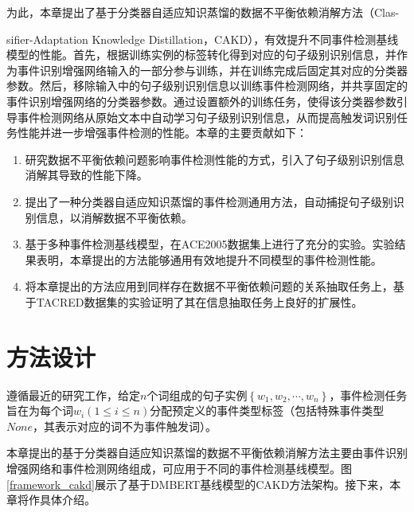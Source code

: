 为此，本章提出了基于分类器自适应知识蒸馏的数据不平衡依赖消解方法（Clas-

\noindent sifier-Adaptation Knowledge Distillation，CAKD），有效提升不同事件检测基线模型的性能。首先，根据训练实例的标签转化得到对应的句子级别识别信息，并作为事件识别增强网络输入的一部分参与训练，并在训练完成后固定其对应的分类器参数。然后，移除输入中的句子级别识别信息以训练事件检测网络，并共享固定的事件识别增强网络的分类器参数。通过设置额外的训练任务，使得该分类器参数引导事件检测网络从原始文本中自动学习句子级别识别信息，从而提高触发词识别任务性能并进一步增强事件检测的性能。本章的主要贡献如下：
\begin{enumerate}
    \item 研究数据不平衡依赖问题影响事件检测性能的方式，引入了句子级别识别信息消解其导致的性能下降。
    \item 提出了一种分类器自适应知识蒸馏的事件检测通用方法，自动捕捉句子级别识别信息，以消解数据不平衡依赖。
    \item 基于多种事件检测基线模型，在ACE2005数据集上进行了充分的实验。实验结果表明，本章提出的方法能够通用有效地提升不同模型的事件检测性能。
    \item 将本章提出的方法应用到同样存在数据不平衡依赖问题的关系抽取任务上，基于TACRED数据集的实验证明了其在信息抽取任务上良好的扩展性。
\end{enumerate}

\section{方法设计}
遵循最近的研究工作，给定$n$个词组成的句子实例$\left\{w_{1}, w_{2}, \cdots, w_{n}\right\}$，事件检测任务旨在为每个词$w_{i} \left(1 \leq i \leq n\right)$分配预定义的事件类型标签（包括特殊事件类型$None$，其表示对应的词不为事件触发词）。

本章提出的基于分类器自适应知识蒸馏的数据不平衡依赖消解方法主要由事件识别增强网络和事件检测网络组成，可应用于不同的事件检测基线模型。图\ref{framework_cakd}展示了基于DMBERT基线模型的CAKD方法架构。接下来，本章将作具体介绍。


